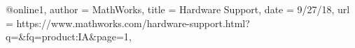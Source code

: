 @online{1,
	author = {MathWorks},
	title = {Hardware Support},
	date = {9/27/18},
	url = {https://www.mathworks.com/hardware-support.html?q=&fq=product:IA&page=1},
}

